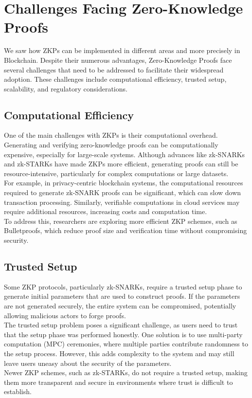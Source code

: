 \section{Challenges Facing Zero-Knowledge Proofs}

We saw how ZKPs can be implemented in different areas and more precisely in Blockchain. Despite their numerous advantages, Zero-Knowledge Proofs face several challenges that need to be addressed to facilitate their widespread adoption. These challenges include computational efficiency, trusted setup, scalability, and regulatory considerations.

\subsection{Computational Efficiency}

One of the main challenges with ZKPs is their computational overhead. Generating and verifying zero-knowledge proofs can be computationally expensive, especially for large-scale systems. Although advances like zk-SNARKs and zk-STARKs have made ZKPs more efficient, generating proofs can still be resource-intensive, particularly for complex computations or large datasets.
\\
For example, in privacy-centric blockchain systems, the computational resources required to generate zk-SNARK proofs can be significant, which can slow down transaction processing. Similarly, verifiable computations in cloud services may require additional resources, increasing costs and computation time.
\\
To address this, researchers are exploring more efficient ZKP schemes, such as Bulletproofs, which reduce proof size and verification time without compromising security.

\subsection{Trusted Setup}

Some ZKP protocols, particularly zk-SNARKs, require a trusted setup phase to generate initial parameters that are used to construct proofs. If the parameters are not generated securely, the entire system can be compromised, potentially allowing malicious actors to forge proofs.
\\
The trusted setup problem poses a significant challenge, as users need to trust that the setup phase was performed honestly. One solution is to use multi-party computation (MPC) ceremonies, where multiple parties contribute randomness to the setup process. However, this adds complexity to the system and may still leave users uneasy about the security of the parameters.
\\
Newer ZKP schemes, such as zk-STARKs, do not require a trusted setup, making them more transparent and secure in environments where trust is difficult to establish.

